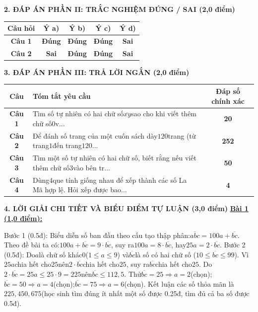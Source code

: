 \documentclass[11pt,a4paper]{article}
\begin{document}
\noindent\textbf{\large 2. ĐÁP ÁN PHẦN II: TRẮC NGHIỆM ĐÚNG / SAI (2,0 điểm)}
\vspace{4pt}
\begin{center}
\begin{tabular}{|c|c|c|c|c|}
\hline
\textbf{Câu hỏi} & \textbf{Ý a)} & \textbf{Ý b)} & \textbf{Ý c)} & \textbf{Ý d)} \\
\hline
\textbf{Câu 1} & \textbf{Đúng} & \textbf{Đúng} & \textbf{Đúng} & \textbf{Sai} \\
\hline
\textbf{Câu 2} & \textbf{Sai} & \textbf{Đúng} & \textbf{Đúng} & \textbf{Sai} \\
\hline
\end{tabular}
\end{center}
\vspace{6pt}


\noindent\textbf{\large 3. ĐÁP ÁN PHẦN III: TRẢ LỜI NGẮN (2,0 điểm)}
\vspace{4pt}
\begin{center}
\begin{tabular}{|c|m{11cm}|c|}
\hline
\textbf{Câu} & \textbf{Tóm tắt yêu cầu} & \textbf{Đáp số chính xác} \\
\hline
\textbf{Câu 1} & Tìm số tự nhiên có hai chữ số$\overline{xy}$sao cho khi viết thêm chữ số$0$v... & \textbf{20} \\
\hline
\textbf{Câu 2} & Để đánh số trang của một cuốn sách dày$120$trang (từ trang$1$đến trang$120$... & \textbf{252} \\
\hline
\textbf{Câu 3} & Tìm một số tự nhiên có hai chữ số, biết rằng nếu viết thêm chữ số$3$vào bên tr... & \textbf{50} \\
\hline
\textbf{Câu 4} & Dùng$4$que tính giống nhau để xếp thành các số La Mã hợp lệ. Hỏi xếp được bao... & \textbf{4} \\
\hline
\end{tabular}
\end{center}
\vspace{6pt}


\noindent\textbf{\large 4. LỜI GIẢI CHI TIẾT VÀ BIỂU ĐIỂM TỰ LUẬN (3,0 điểm)}
\vspace{4pt}
\noindent\textbf{\underline{Bài 1 (1,0 điểm):}}\par\vspace{3pt}
Bước 1 (0.5đ): Biểu diễn số ban đầu theo cấu tạo thập phân:$\overline{abc} = 100a + \overline{bc}$. Theo đề bài ta có:$100a + \overline{bc} = 9 \cdot \overline{bc}$, suy ra$100a = 8 \cdot \overline{bc}$, hay$25a = 2 \cdot \overline{bc}$. Bước 2 (0.5đ): Do$a$là chữ số khác$0$($1 \le a \le 9$) và$\overline{bc}$là số có hai chữ số ($10 \le \overline{bc} \le 99$). Vì$25a$chia hết cho$25$nên$2 \cdot \overline{bc}$chia hết cho$25$, suy ra$\overline{bc}$chia hết cho$25$. Do$2 \cdot \overline{bc} = 25a \le 25 \cdot 9 = 225$nên$\overline{bc} \le 112,5$. Thử$\overline{bc} = 25 \Rightarrow a = 2$(chọn);$\overline{bc} = 50 \Rightarrow a = 4$(chọn);$\overline{bc} = 75 \Rightarrow a = 6$(chọn). Kết luận các số thỏa mãn là$225, 450, 675$(học sinh tìm đúng ít nhất một số được 0.25đ, tìm đủ cả ba số được 0.5đ).\par\vspace{8pt}
\end{document}
